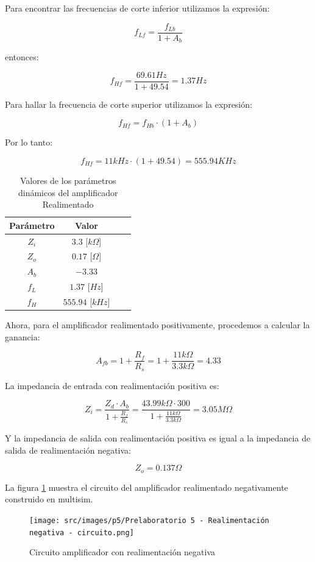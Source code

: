 Para encontrar las frecuencias de corte inferior utilizamos la expresión:

$$f_{Lf} = \frac{f_{Lb}}{1 + A_{b}}$$

entonces:

$$f_{Hf} = \frac{69.61 Hz}{1 + 49.54} = 1.37 Hz$$

Para hallar la frecuencia de corte superior utilizamos la expresión:

$$f_{Hf} = f_{Hb}\cdot (1 + A_{b})$$

Por lo tanto:

$$f_{Hf} = 11kHz\cdot (1 + 49.54) = 555.94KHz$$

\begin{table}[ht]
    \centering
    \begin{tabular}{|c|c|c|c|}
        \hline
        \textbf{Parámetro} & \textbf{Valor} \\ \hline
        $Z_i$ & $3.3$ [$k\Omega$] \\ \hline
        $Z_o$ & $0.17 $ [$\Omega$] \\ \hline
        $A_b$ & $-3.33$ \\ \hline
        $f_L$ & $1.37$ [$Hz$] \\ \hline
        $f_H$ & $555.94$ [$kHz$] \\ \hline
    \end{tabular}
    \caption{Valores de los parámetros dinámicos del amplificador Realimentado}
    \label{tab:amplificador-base-dinamico}

\end{table}

Ahora, para el amplificador realimentado positivamente, procedemos a calcular la ganancia:

$$A_{fb} = 1 + \frac{R_f}{R_s} = 1 + \frac{11k\Omega}{3.3k\Omega} = 4.33$$

La impedancia de entrada con realimentación positiva es:

$$ Z_i = \frac{Z_d \cdot A_b}{1 + \frac{R_f}{R_s}} = \frac{43.99k\Omega \cdot 300}{1 + \frac{11k\Omega}{3.3k\Omega}} = 3.05M\Omega$$

Y la impedancia de salida con realimentación positiva es igual a la impedancia de salida de realimentación negativa:

$$Z_o = 0.137 \Omega$$

La figura \ref{fig:amplificador-realimentado-negativo} muestra el circuito del amplificador realimentado negativamente construido en multisim.

\begin{figure}[ht]
    \centering
    \texttt{[image: src/images/p5/Prelaboratorio 5 - Realimentación negativa - circuito.png]}
    \caption{Circuito amplificador con realimentación negativa}
    \label{fig:amplificador-realimentado-negativo}
\end{figure}
\FloatBarrier

